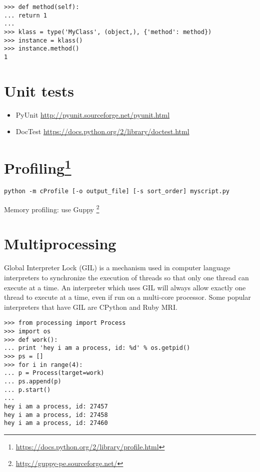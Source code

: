 \documentclass[fleqn,10pt]{SelfArx} %
\begin{document}
	\begin{lstlisting}
>>> def method(self):
... return 1
...
>>> klass = type('MyClass', (object,), {'method': method})
>>> instance = klass()
>>> instance.method()
1
	\end{lstlisting}
		

	\section{Unit tests}
	
	\begin{itemize}
		\item PyUnit \url{http://pyunit.sourceforge.net/pyunit.html}
		\item DocTest \url{https://docs.python.org/2/library/doctest.html}
	\end{itemize}

	
	\section[Profiling]{Profiling\footnote{\url{https://docs.python.org/2/library/profile.html}}}
	
	\begin{lstlisting}
python -m cProfile [-o output_file] [-s sort_order] myscript.py
	\end{lstlisting}
	
	Memory profiling: use Guppy \footnote{\url{http://guppy-pe.sourceforge.net/}}
	
	
	\section{Multiprocessing}
	
	Global Interpreter Lock (GIL) is a mechanism used in computer language interpreters to synchronize the execution of threads so that only one thread can execute at a time. An interpreter which uses GIL will always allow exactly one thread to execute at a time, even if run on a multi-core processor. Some popular interpreters that have GIL are CPython and Ruby MRI.
	
	\begin{lstlisting}
>>> from processing import Process
>>> import os
>>> def work():
... print 'hey i am a process, id: %d' % os.getpid()
>>> ps = []
>>> for i in range(4):
... p = Process(target=work)
... ps.append(p)
... p.start()
... 
hey i am a process, id: 27457
hey i am a process, id: 27458
hey i am a process, id: 27460
	\end{lstlisting}
	
\end{document}
